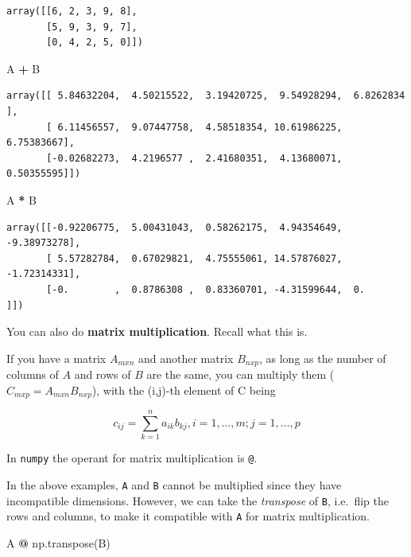 \documentclass[
  letterpaper,
]{scrbook}
\newenvironment{Shaded}{\begin{snugshade}}{\end{snugshade}}
\newcommand{\NormalTok}[1]{#1}
\newcommand{\OperatorTok}[1]{\textcolor[rgb]{0.81,0.36,0.00}{\textbf{#1}}}
\begin{document}
\begin{verbatim}
array([[6, 2, 3, 9, 8],
       [5, 9, 3, 9, 7],
       [0, 4, 2, 5, 0]])
\end{verbatim}

\begin{Shaded}
\begin{Highlighting}[]
\NormalTok{A }\OperatorTok{+}\NormalTok{ B}
\end{Highlighting}
\end{Shaded}

\begin{verbatim}
array([[ 5.84632204,  4.50215522,  3.19420725,  9.54928294,  6.8262834 ],
       [ 6.11456557,  9.07447758,  4.58518354, 10.61986225,  6.75383667],
       [-0.02682273,  4.2196577 ,  2.41680351,  4.13680071,  0.50355595]])
\end{verbatim}

\begin{Shaded}
\begin{Highlighting}[]
\NormalTok{A }\OperatorTok{*}\NormalTok{ B}
\end{Highlighting}
\end{Shaded}

\begin{verbatim}
array([[-0.92206775,  5.00431043,  0.58262175,  4.94354649, -9.38973278],
       [ 5.57282784,  0.67029821,  4.75555061, 14.57876027, -1.72314331],
       [-0.        ,  0.8786308 ,  0.83360701, -4.31599644,  0.        ]])
\end{verbatim}

You can also do \textbf{matrix multiplication}. Recall what this is.

If you have a matrix \(A_{m x n}\) and another matrix \(B_{n x p}\), as long as the number of columns of \(A\) and rows of \(B\) are the same, you can multiply them (\(C_{m x p} = A_{m x n}B_{n x p}\)), with the (i,j)-th element of C being

\[ c_{ij} = \sum_{k=1}^n a_{ik}b_{kj}, i= 1, \dots, m; j = 1, \dots, p\]

In \texttt{numpy} the operant for matrix multiplication is \texttt{@}.

In the above examples, \texttt{A} and \texttt{B} cannot be multiplied since they have incompatible dimensions. However, we can take the \emph{transpose} of \texttt{B}, i.e.~flip the rows and columns, to make it compatible with \texttt{A} for matrix multiplication.

\begin{Shaded}
\begin{Highlighting}[]
\NormalTok{A }\OperatorTok{@}\NormalTok{ np.transpose(B)}
\end{Highlighting}
\end{Shaded}
\end{document}
